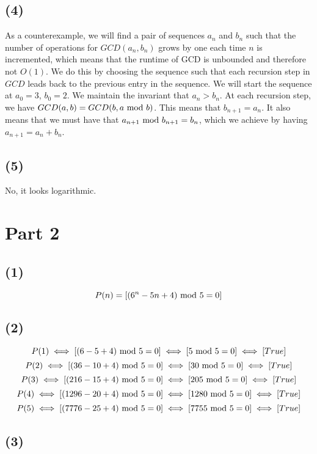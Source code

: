 \documentclass[a4paper]{article}
\begin{document}
\subsection{(4)}

As a counterexample, we will find a pair of sequences $a_n$ and $b_n$ such that the number of operations for $GCD(a_n, b_n)$ grows by one each time $n$ is incremented, which means that the runtime of GCD is unbounded and therefore not $O(1)$. We do this by choosing the sequence such that each recursion step in $GCD$ leads back to the previous entry in the sequence.
We will start the sequence at $a_0 = 3$, $b_0 = 2$. We maintain the invariant that $a_n > b_n$.
At each recursion step, we have $GCD(a, b) = GCD(b, a \text{ mod } b)$. This means that $b_{n+1} = a_n$. It also means that we must have that $a_{n+1} \text{ mod } b_{n+1} = b_n$, which we achieve by having $a_{n+1} = a_n+b_n$.

\subsection{(5)}

No, it looks logarithmic.

\section{Part 2}

\subsection{(1)}

\[ P(n) = [(6^n - 5n + 4) \text{ mod } 5 = 0] \]

\subsection{(2)}

\[ P(1) \iff [(6 - 5 + 4) \text{ mod } 5 = 0] \iff [5 \text{ mod } 5 = 0] \iff [True] \]
\[ P(2) \iff [(36 - 10 + 4) \text{ mod } 5 = 0] \iff [30 \text{ mod } 5 = 0] \iff [True] \]
\[ P(3) \iff [(216 - 15 + 4) \text{ mod } 5 = 0] \iff [205 \text{ mod } 5 = 0] \iff [True] \]
\[ P(4) \iff [(1296 - 20 + 4) \text{ mod } 5 = 0] \iff [1280 \text{ mod } 5 = 0] \iff [True] \]
\[ P(5) \iff [(7776 - 25 + 4) \text{ mod } 5 = 0] \iff [7755 \text{ mod } 5 = 0] \iff [True] \]

\subsection{(3)}
\end{document}
